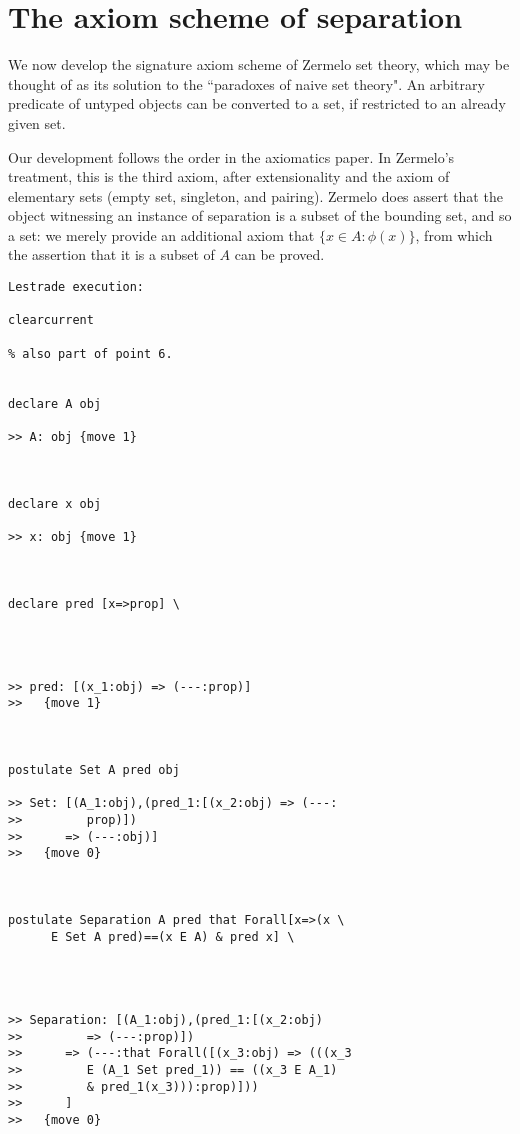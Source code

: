 \documentclass[12pt]{article}
\begin{document}
\section{The axiom scheme of separation}

We now develop the signature axiom scheme of Zermelo set theory, which may be thought of as its solution to the ``paradoxes of naive set theory".  An arbitrary predicate of untyped objects can be converted to a set, if restricted to an already given set.

Our development follows the order in the axiomatics paper.  In Zermelo's treatment, this is the third axiom, after extensionality and the axiom of elementary sets
(empty set, singleton, and pairing).  Zermelo does assert that the object witnessing an instance of separation is a subset of the bounding set, and so a set:  we merely provide
an additional axiom that $\{x \in A : \phi(x)\}$, from which the assertion that it is a subset of $A$ can be proved.

\begin{verbatim}Lestrade execution:

clearcurrent

% also part of point 6.


declare A obj

>> A: obj {move 1}



declare x obj

>> x: obj {move 1}



declare pred [x=>prop] \
   



>> pred: [(x_1:obj) => (---:prop)]
>>   {move 1}



postulate Set A pred obj

>> Set: [(A_1:obj),(pred_1:[(x_2:obj) => (---:
>>         prop)])
>>      => (---:obj)]
>>   {move 0}



postulate Separation A pred that Forall[x=>(x \
      E Set A pred)==(x E A) & pred x] \
   



>> Separation: [(A_1:obj),(pred_1:[(x_2:obj)
>>         => (---:prop)])
>>      => (---:that Forall([(x_3:obj) => (((x_3
>>         E (A_1 Set pred_1)) == ((x_3 E A_1)
>>         & pred_1(x_3))):prop)]))
>>      ]
>>   {move 0}


\end{verbatim}
\end{document}
